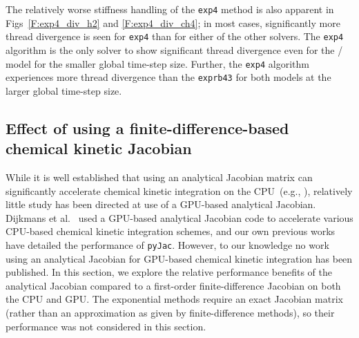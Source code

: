 \documentclass[preprint,review,11pt]{elsarticle}
\begin{document}
The relatively worse stiffness handling of the \texttt{exp4} method is also apparent in Figs~\ref{F:exp4_div_h2} and \ref{F:exp4_div_ch4}; in most cases, significantly more thread divergence is seen for \texttt{exp4} than for either of the other solvers.
The \texttt{exp4} algorithm is the only solver to show significant thread divergence even for the \slash{} model for the smaller global time-step size.
Further, the \texttt{exp4} algorithm experiences more thread divergence than the \texttt{exprb43} for both models at the larger global time-step size.

\subsection{Effect of using a finite-difference-based chemical kinetic Jacobian}

While it is well established that using an analytical Jacobian matrix can significantly accelerate chemical kinetic integration on the CPU~(e.g., \cite{Lu:2009gh,stone2014comparison,Schwer2002270}), relatively little study has been directed at use of a GPU-based analytical Jacobian.
Dijkmans et al.~\cite{Dijkmans:2014bb} used a GPU-based analytical Jacobian code to accelerate various CPU-based chemical kinetic integration schemes, and our own previous works~\cite{Niemeyer:2016aa,Niemeyer:2015ws} have detailed the performance of \texttt{pyJac}.
However, to our knowledge no work using an analytical Jacobian for GPU-based chemical kinetic integration has been published.
In this section, we explore the relative performance benefits of the analytical Jacobian compared to a first-order finite-difference Jacobian on both the CPU and GPU.
The exponential methods require an exact Jacobian matrix (rather than an approximation as given by finite-difference methods), so their performance was not considered in this section.
\end{document}
